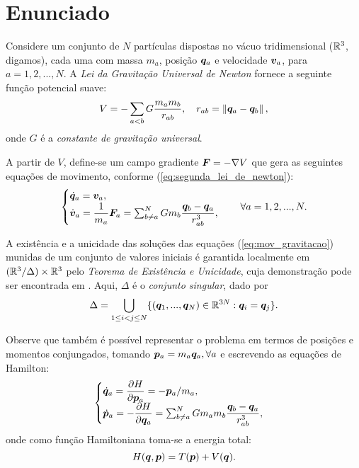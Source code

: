 \section{Enunciado}
Considere um conjunto de $N$ partículas dispostas no vácuo tridimensional ($\mathbb{R}^3$, digamos), cada uma com massa $m_a$, posição $\bm q_a$ e velocidade $\bm v_a$, para $a = 1, 2, ..., N$. A \textit{Lei da Gravitação Universal de Newton} fornece a seguinte função potencial suave:
\begin{equation}\label{eq:potencial_newtoniano}
    V = - \sum_{a < b} G \dfrac{m_a m_b}{r_{ab}},
    \quad
    r_{ab} = \left\Vert \bm q_a - \bm q_b \right\Vert,
\end{equation}
onde $G$ é a \textit{constante de gravitação universal}.

A partir de $V$, define-se um campo gradiente $\bm F = - \nabla V$ que gera as seguintes equações de movimento, conforme (\ref{eq:segunda_lei_de_newton}):
\begin{equation}\label{eq:mov_gravitacao}
    \begin{cases}
        \dot {\bm q}_a = \bm v_a, \\
        \dot {\bm v}_a = \dfrac{1}{m_a} \bm F_a = \sum_{b \neq a}^N G m_b \dfrac{\bm q_b - \bm q_a}{r_{ab}^3},
    \end{cases}
        \quad \forall a = 1, 2, ..., N.
\end{equation}

A existência e a unicidade das soluções das equações (\ref{eq:mov_gravitacao}) munidas de um conjunto de valores iniciais é garantida localmente em $(\mathbb{R}^3 / \Delta) \times \mathbb{R}^3$ pelo \textit{Teorema de Existência e Unicidade}, cuja demonstração pode ser encontrada em \citep[34-36]{Volchan:2007}. Aqui, $\Delta$ é o \textit{conjunto singular}, dado por
\begin{equation*}
    \Delta = \bigcup_{1 \leq i < j \leq N} \{(\bm q_1, ..., \bm q_N) \in \mathbb{R}^{3N}: \bm q_i = \bm q_j \}.
\end{equation*}

Observe que também é possível representar o problema em termos de posições e momentos conjungados, tomando $\bm p_a = m_a \bm q_a, \forall a$ e escrevendo as equações de Hamilton:
\begin{equation}
    \begin{cases}
        \dot {\bm q}_a = \dfrac{\partial H}{\partial \bm p_a} = - \bm p_a / m_a, \\
        \dot {\bm p}_a = - \dfrac{\partial H}{\partial \bm q_a} = \sum_{b \neq a}^N G m_a m_b \dfrac{\bm q_b - \bm q_a}{r_{ab}^3},
    \end{cases}
\end{equation}
onde como função Hamiltoniana toma-se a energia total:
\begin{equation*}
    H (\bm q, \bm p) = T(\bm p) + V(\bm q).
\end{equation*}